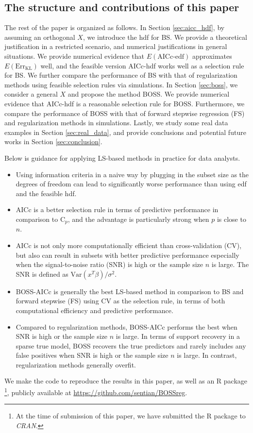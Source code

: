 \subsection{The structure and contributions of this paper}
The rest of the paper is organized as follows. In Section \ref{sec:aicc_hdf}, by assuming an orthogonal $X$, we introduce the hdf for BS. We provide a theoretical justification in a restricted scenario, and numerical justifications in general situations. We provide numerical evidence that $E(\text{AICc-edf})$ approximates $E(\text{Err}_\text{KL})$ well, and the feasible version AICc-hdf works well as a selection rule for BS. We further compare the performance of BS with that of regularization methods using feasible selection rules via simulations. In Section \ref{sec:boss}, we consider a general $X$ and propose the method BOSS. We provide numerical evidence that AICc-hdf is a reasonable selection rule for BOSS. Furthermore, we compare the performance of BOSS with that of forward stepwise regression (FS) and regularization methods in simulations. Lastly, we study some real data examples in Section \ref{sec:real_data}, and provide conclusions and potential future works in Section \ref{sec:conclusion}.

Below is guidance for applying LS-based methods in practice for data analysts.
\begin{itemize}
	\item Using information criteria in a naive way by plugging in the subset size as the degrees of freedom can lead to significantly worse performance than using edf and the feasible hdf.
	\item AICc is a better selection rule in terms of predictive performance in comparison to C$_p$, and the advantage is particularly strong when $p$ is close to $n$.
	\item AICc is not only more computationally efficient than cross-validation (CV), but also can result in subsets with better predictive performance especially when the signal-to-noise ratio (SNR) is high or the sample size $n$ is large. The SNR is defined as $\text{Var}(x^T \beta) / \sigma^2$.
	\item BOSS-AICc is generally the best LS-based method in comparison to BS and forward stepwise (FS) \citep{efroymson1960multiple} using CV as the selection rule, in terms of both computational efficiency and predictive performance.
	\item Compared to regularization methods, BOSS-AICc performs the best when SNR is high or the sample size $n$ is large. In terms of support recovery in a sparse true model, BOSS recovers the true predictors and rarely includes any false positives when SNR is high or the sample size $n$ is large. In contrast, regularization methods generally overfit. 
\end{itemize}

We make the code to reproduce the results in this paper, as well as an R package \footnote{At the time of submission of this paper, we have submitted the R package to \textit{CRAN}.}, publicly available at \url{https://github.com/sentian/BOSSreg}. 
